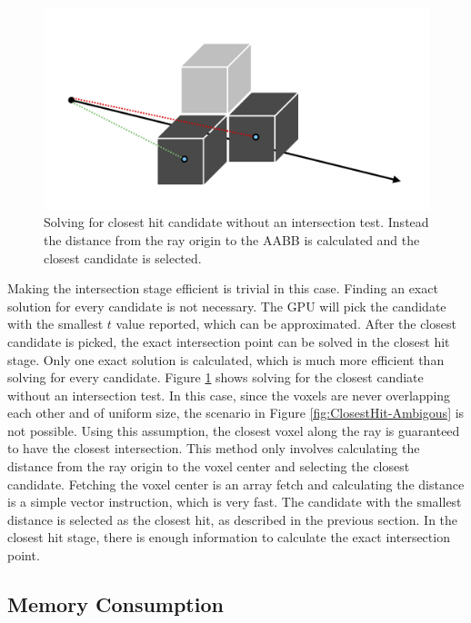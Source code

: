 \documentclass[12pt]{article}
\begin{document}
\begin{figure}[H]
    \begin{center}
        \includegraphics[scale=0.22]{ClosestHit-Approx}
    \end{center}
    \caption{
        Solving for closest hit candidate without an intersection test.
        Instead the distance from the ray origin to the AABB is calculated and the closest candidate is selected.
        }
    \label{fig:ClosestHit-Approx}
\end{figure}

Making the intersection stage efficient is trivial in this case.
Finding an exact solution for every candidate is not necessary. 
The GPU will pick the candidate with the smallest $t$ value reported, which can be approximated.
After the closest candidate is picked, the exact intersection point can be solved in the closest hit stage.
Only one exact solution is calculated, which is much more efficient than solving for every candidate.
Figure \ref{fig:ClosestHit-Approx} shows solving for the closest candiate without an intersection test.
In this case, since the voxels are never overlapping each other and of uniform size, the scenario in Figure \ref{fig:ClosestHit-Ambigous} is not possible.
Using this assumption, the closest voxel along the ray is guaranteed to have the closest intersection.
This method only involves calculating the distance from the ray origin to the voxel center and selecting the closest candidate.
Fetching the voxel center is an array fetch and calculating the distance is a simple vector instruction, which is very fast.
The candidate with the smallest distance is selected as the closest hit, as described in the previous section.
In the closest hit stage, there is enough information to calculate the exact intersection point.

\subsection{Memory Consumption}
\end{document}
